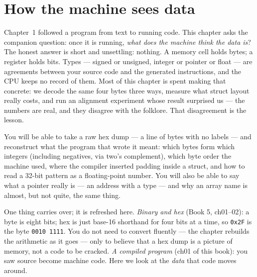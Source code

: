 \chapter{How the machine sees data}
\label{ch:02}

Chapter~1 followed a program from text to running code. This chapter asks
the companion question: once it is running, \emph{what does the machine
think the data is}? The honest answer is short and unsettling: nothing.
A memory cell holds bytes; a register holds bits. Types --- signed or
unsigned, integer or pointer or float --- are agreements between your
source code and the generated instructions, and the CPU keeps no record
of them. Most of this chapter is spent making that concrete: we decode
the same four bytes three ways, measure what struct layout really costs,
and run an alignment experiment whose result surprised us --- the numbers
are real, and they disagree with the folklore. That disagreement is the
lesson.

\begin{wins}
You will be able to take a raw hex dump --- a line of bytes with no
labels --- and reconstruct what the program that wrote it meant: which
bytes form which integers (including negatives, via two's complement),
which byte order the machine used, where the compiler inserted padding
inside a struct, and how to read a 32-bit pattern as a floating-point
number. You will also be able to say what a pointer really is --- an
address with a type --- and why an array name is almost, but not quite,
the same thing.
\end{wins}

\begin{rulebox}
One thing carries over; it is refreshed here.
\emph{Binary and hex} (Book 5, ch01--02): a byte is eight bits; hex is
just base-16 shorthand for four bits at a time, so \texttt{0x2F} is the
byte \texttt{0010\,1111}. You do not need to convert fluently --- the
chapter rebuilds the arithmetic as it goes --- only to believe that a
hex dump is a picture of memory, not a code to be cracked.
\emph{A compiled program} (ch01 of this book): you saw source become
machine code. Here we look at the \emph{data} that code moves around.
\end{rulebox}

%
%

